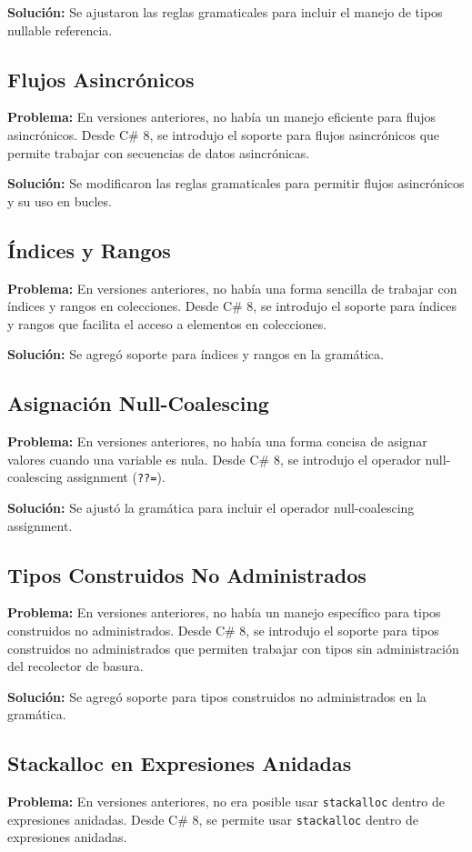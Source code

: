 \textbf{Solución:} Se ajustaron las reglas gramaticales para incluir el manejo de tipos nullable referencia.

\subsection{Flujos Asincrónicos}
\textbf{Problema:} En versiones anteriores, no había un manejo eficiente para flujos asincrónicos. Desde C\# 8, se introdujo el soporte para flujos asincrónicos que permite trabajar con secuencias de datos asincrónicas.

\textbf{Solución:} Se modificaron las reglas gramaticales para permitir flujos asincrónicos y su uso en bucles.

\subsection{Índices y Rangos}
\textbf{Problema:} En versiones anteriores, no había una forma sencilla de trabajar con índices y rangos en colecciones. Desde C\# 8, se introdujo el soporte para índices y rangos que facilita el acceso a elementos en colecciones.

\textbf{Solución:} Se agregó soporte para índices y rangos en la gramática.

\subsection{Asignación Null-Coalescing}
\textbf{Problema:} En versiones anteriores, no había una forma concisa de asignar valores cuando una variable es nula. Desde C\# 8, se introdujo el operador null-coalescing assignment (\texttt{??=}).

\textbf{Solución:} Se ajustó la gramática para incluir el operador null-coalescing assignment.

\subsection{Tipos Construidos No Administrados}
\textbf{Problema:} En versiones anteriores, no había un manejo específico para tipos construidos no administrados. Desde C\# 8, se introdujo el soporte para tipos construidos no administrados que permiten trabajar con tipos sin administración del recolector de basura.

\textbf{Solución:} Se agregó soporte para tipos construidos no administrados en la gramática.

\subsection{Stackalloc en Expresiones Anidadas}
\textbf{Problema:} En versiones anteriores, no era posible usar \texttt{stackalloc} dentro de expresiones anidadas. Desde C\# 8, se permite usar \texttt{stackalloc} dentro de expresiones anidadas.

